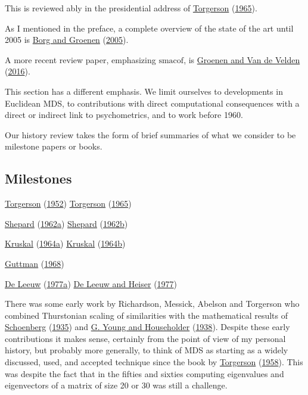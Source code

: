 \documentclass[
  12pt,
]{book}
\theoremstyle{definition}
\theoremstyle{definition}
\theoremstyle{definition}
\theoremstyle{definition}
\theoremstyle{remark}
\begin{document}
This is reviewed ably in the presidential address of \protect\hyperlink{ref-torgerson_65}{Torgerson} (\protect\hyperlink{ref-torgerson_65}{1965}).

As I mentioned in the preface, a complete overview of the state of the art until 2005 is \protect\hyperlink{ref-borg_groenen_05}{Borg and Groenen} (\protect\hyperlink{ref-borg_groenen_05}{2005}).

A more recent review paper, emphasizing \(\textrm{smacof}\), is \protect\hyperlink{ref-groenen_vandevelden_16}{Groenen and Van de Velden} (\protect\hyperlink{ref-groenen_vandevelden_16}{2016}).

This section has a different emphasis. We limit ourselves to developments in Euclidean MDS, to contributions with direct computational consequences with a direct or indirect link to psychometrics, and to work before 1960.

Our history review takes the form of brief summaries of what we consider to be milestone papers or books.

\hypertarget{milestones}{%
\subsection{Milestones}\label{milestones}}

\protect\hyperlink{ref-torgerson_52}{Torgerson} (\protect\hyperlink{ref-torgerson_52}{1952})
\protect\hyperlink{ref-torgerson_65}{Torgerson} (\protect\hyperlink{ref-torgerson_65}{1965})

\protect\hyperlink{ref-shepard_62a}{Shepard} (\protect\hyperlink{ref-shepard_62a}{1962a})
\protect\hyperlink{ref-shepard_62b}{Shepard} (\protect\hyperlink{ref-shepard_62b}{1962b})

\protect\hyperlink{ref-kruskal_64a}{Kruskal} (\protect\hyperlink{ref-kruskal_64a}{1964a})
\protect\hyperlink{ref-kruskal_64b}{Kruskal} (\protect\hyperlink{ref-kruskal_64b}{1964b})

\protect\hyperlink{ref-guttman_68}{Guttman} (\protect\hyperlink{ref-guttman_68}{1968})

\protect\hyperlink{ref-deleeuw_C_77}{De Leeuw} (\protect\hyperlink{ref-deleeuw_C_77}{1977a})
\protect\hyperlink{ref-deleeuw_heiser_C_77}{De Leeuw and Heiser} (\protect\hyperlink{ref-deleeuw_heiser_C_77}{1977})

There was some early work by Richardson, Messick,
Abelson and Torgerson who combined Thurstonian scaling of similarities
with the mathematical results of \protect\hyperlink{ref-schoenberg_35}{Schoenberg} (\protect\hyperlink{ref-schoenberg_35}{1935}) and
\protect\hyperlink{ref-young_householder_38}{G. Young and Householder} (\protect\hyperlink{ref-young_householder_38}{1938}). Despite these early contributions it makes sense,
certainly from the point of view of my personal history, but probably
more generally, to think of MDS as starting as a widely discussed, used,
and accepted technique since the book by \protect\hyperlink{ref-torgerson_58}{Torgerson} (\protect\hyperlink{ref-torgerson_58}{1958}). This was despite
the fact that in the fifties and sixties computing eigenvalues and
eigenvectors of a matrix of size 20 or 30 was still a challenge.
\end{document}
